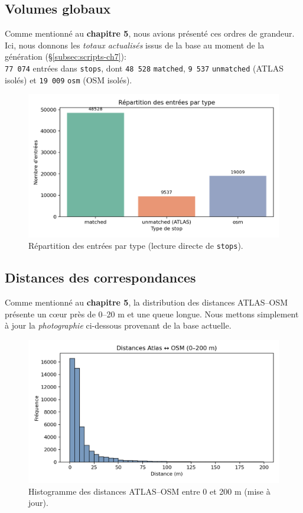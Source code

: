 \subsection{Volumes globaux}
Comme mentionné au \textbf{chapitre 5}, nous avions présenté ces ordres de grandeur. Ici, nous donnons les \textit{totaux actualisés} issus de la base au moment de la génération (\S\ref{subsec:scripts-ch7}):\\
\texttt{77\,074} entrées dans \texttt{stops}, dont \texttt{48\,528} \texttt{matched}, \texttt{9\,537} \texttt{unmatched} (ATLAS isolés) et \texttt{19\,009} \texttt{osm} (OSM isolés).

\begin{figure}[h]
  \centering
  \includegraphics[width=0.68\linewidth]{figures/chap7/stops_by_type.png}
  \caption{Répartition des entrées par type (lecture directe de \texttt{stops}).}
\end{figure}

\subsection{Distances des correspondances}
Comme mentionné au \textbf{chapitre 5}, la distribution des distances ATLAS–OSM présente un cœur près de 0–20 m et une queue longue. Nous mettons simplement à jour la \textit{photographie} ci-dessous provenant de la base actuelle.

\begin{figure}[h]
  \centering
  \includegraphics[width=0.68\linewidth]{figures/chap7/distances_hist_0_200.png}
  \caption{Histogramme des distances ATLAS–OSM entre 0 et 200 m (mise à jour).}
\end{figure}

